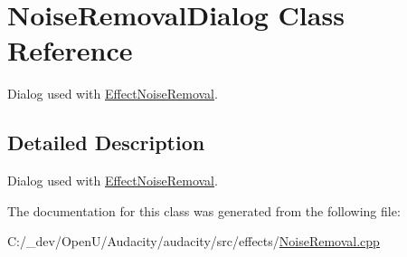 \hypertarget{class_noise_removal_dialog}{}\section{Noise\+Removal\+Dialog Class Reference}
\label{class_noise_removal_dialog}


Dialog used with \hyperlink{class_effect_noise_removal}{Effect\+Noise\+Removal}.  




\subsection{Detailed Description}
Dialog used with \hyperlink{class_effect_noise_removal}{Effect\+Noise\+Removal}. 

The documentation for this class was generated from the following file\+:\begin{DoxyCompactItemize}
\item 
C\+:/\+\_\+dev/\+Open\+U/\+Audacity/audacity/src/effects/\hyperlink{_noise_removal_8cpp}{Noise\+Removal.\+cpp}\end{DoxyCompactItemize}
